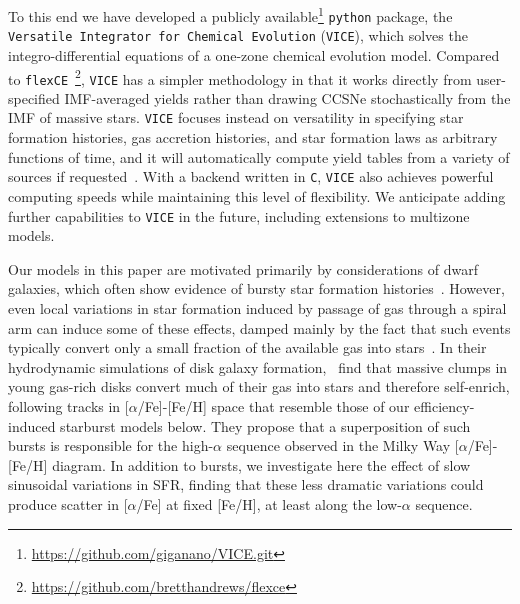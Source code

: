 To this end we have developed a publicly available\footnote{
	\url{https://github.com/giganano/VICE.git}
} \texttt{python} package, the \texttt{Versatile Integrator for Chemical 
Evolution} (\texttt{VICE}), which solves the integro-differential equations of 
a one-zone chemical evolution model. 
Compared to \texttt{flexCE}~\citep{Andrews2017}\footnote{
	\url{https://github.com/bretthandrews/flexce}
}, \texttt{VICE} has a simpler methodology in that it works directly from 
user-specified IMF-averaged yields rather than drawing CCSNe stochastically 
from the IMF of massive stars. \texttt{VICE} focuses instead on versatility 
in specifying star formation histories, gas accretion histories, and star 
formation laws as arbitrary functions of time, and it will automatically 
compute yield tables from a variety of sources if requested~\citep[e.g.][among 
others to be added in subsequent versions]{Woosley1995, Iwamoto1999, 
Chieffi2004, Karakas2010, Cristallo2011, Seitenzahl2013, Limongi2018}. With a 
backend written in \texttt{C}, \texttt{VICE} also achieves powerful computing 
speeds while maintaining this level of flexibility. We anticipate adding 
further capabilities to \texttt{VICE} in the future, including extensions to 
multizone models.
\par 
Our models in this paper are motivated primarily by considerations of dwarf 
galaxies, which often show evidence of bursty star formation 
histories~\citep[e.g.][]{Weisz2011, Weisz2014a}. However, even local variations 
in star formation induced by passage of gas through a spiral arm can induce 
some of these effects, damped mainly by the fact that such events typically 
convert only a small fraction of the available gas into 
stars~\citep{Weinberg2017b}. In their hydrodynamic simulations of disk 
galaxy formation,~\citet{Clarke2019} find that massive clumps in young 
gas-rich disks convert much of their gas into stars and therefore self-enrich, 
following tracks in [$\alpha$/Fe]-[Fe/H] space that resemble those of our 
efficiency-induced starburst models below. They propose that a superposition 
of such bursts is responsible for the high-$\alpha$ sequence observed in the 
Milky Way [$\alpha$/Fe]-[Fe/H] diagram. In addition to bursts, we investigate 
here the effect of slow sinusoidal variations in SFR, finding that these less 
dramatic variations could produce scatter in [$\alpha$/Fe] at fixed [Fe/H], at 
least along the low-$\alpha$ sequence. 

